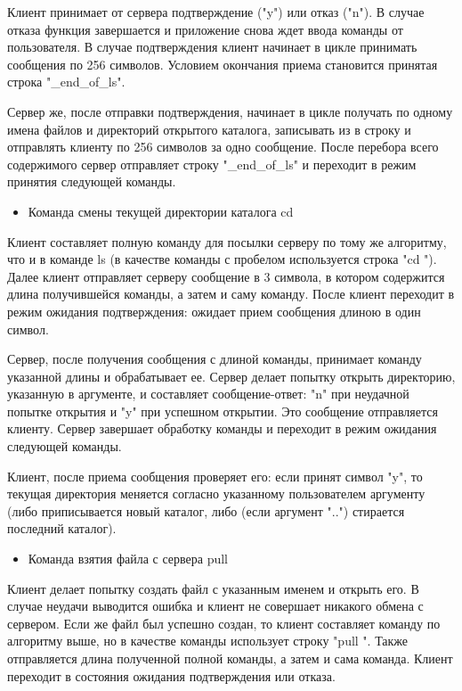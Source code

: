 Клиент принимает от сервера подтверждение ("y") или отказ ("n"). В случае отказа функция завершается и приложение снова ждет ввода команды от пользователя. В случае подтверждения клиент начинает в цикле принимать сообщения по 256 символов. Условием окончания приема становится принятая строка "\_end\_of\_ls".

Сервер же, после отправки подтверждения, начинает в цикле получать по одному имена файлов и директорий открытого каталога, записывать из в строку и отправлять клиенту по 256 символов за одно сообщение. После перебора всего содержимого сервер отправляет строку "\_end\_of\_ls" и переходит в режим принятия следующей команды.

\begin{itemize}
\item Команда смены текущей директории каталога cd
\end{itemize}

Клиент составляет полную команду для посылки серверу по тому же алгоритму, что и в команде ls (в качестве команды с пробелом используется строка "cd "). Далее клиент отправляет серверу сообщение в 3 символа, в котором содержится длина получившейся команды, а затем и саму команду. После клиент переходит в режим ожидания подтверждения: ожидает прием сообщения длиною в один символ.

Сервер, после получения сообщения с длиной команды, принимает команду указанной длины и обрабатывает ее. Сервер делает попытку открыть директорию, указанную в аргументе, и составляет сообщение-ответ: "n" при неудачной попытке открытия и "y" при успешном открытии. Это сообщение отправляется клиенту. Сервер завершает обработку команды и переходит в режим ожидания следующей команды.

Клиент, после приема сообщения проверяет его: если принят символ "y", то текущая директория меняется согласно указанному пользователем аргументу (либо приписывается новый каталог, либо (если аргумент "..") стирается последний каталог). 

\begin{itemize}
\item Команда взятия файла с сервера pull
\end{itemize}

Клиент делает попытку создать файл с указанным именем и открыть его. В случае неудачи выводится ошибка и клиент не совершает никакого обмена с сервером. Если же файл был успешно создан, то клиент составляет команду по алгоритму выше, но в качестве команды использует строку "pull ". Также отправляется длина полученной полной команды, а затем и сама команда. Клиент переходит в состояния ожидания подтверждения или отказа.

